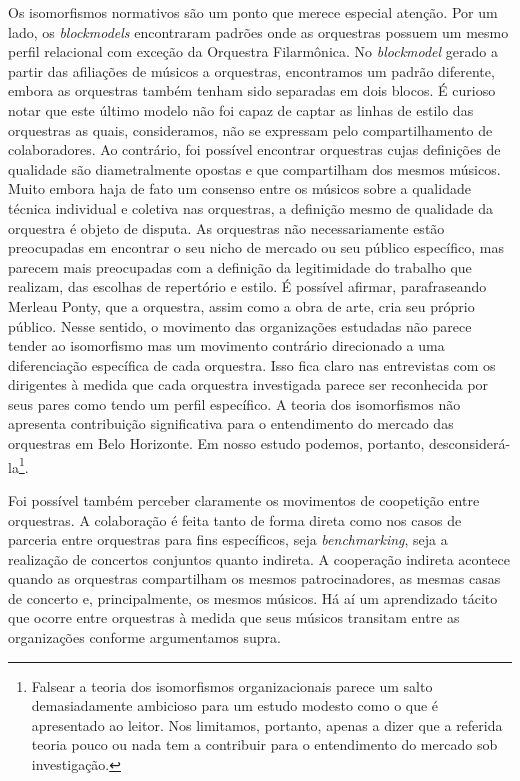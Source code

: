 \documentclass[a4paper, 12pt, openright, oneside, german, french, english, brazil]{abntex2}
\begin{document}
	Os isomorfismos normativos são um ponto que merece especial atenção. Por um lado, os \textit{blockmodels} encontraram padrões onde as orquestras possuem um mesmo perfil relacional com exceção da Orquestra Filarmônica. No \textit{blockmodel} gerado a partir das afiliações de músicos a orquestras, encontramos um padrão diferente, embora as orquestras também tenham sido separadas em dois blocos. É curioso notar que este último modelo não foi capaz de captar as linhas de estilo das orquestras as quais, consideramos, não se expressam pelo compartilhamento de colaboradores. Ao contrário, foi possível encontrar orquestras cujas definições de qualidade são diametralmente opostas e que compartilham dos mesmos músicos. Muito embora haja de fato um consenso entre os músicos sobre a qualidade técnica individual e coletiva nas orquestras, a definição mesmo de qualidade da orquestra é objeto de disputa. As orquestras não necessariamente estão preocupadas em encontrar o seu nicho de mercado ou seu público específico, mas parecem mais preocupadas com a definição da legitimidade do trabalho que realizam, das escolhas de repertório e estilo. É possível afirmar, parafraseando Merleau Ponty, que a orquestra, assim como a obra de arte, cria seu próprio público. Nesse sentido, o movimento das organizações estudadas não parece tender ao isomorfismo mas um movimento contrário direcionado a uma diferenciação específica de cada orquestra. Isso fica claro nas entrevistas com os dirigentes à medida que cada orquestra investigada parece ser reconhecida por seus pares como tendo um perfil específico. A teoria dos isomorfismos não apresenta contribuição significativa para o entendimento do mercado das orquestras em Belo Horizonte. Em nosso estudo podemos, portanto, desconsiderá-la\footnote{Falsear a teoria dos isomorfismos organizacionais parece um salto demasiadamente ambicioso para um estudo modesto como o que é apresentado ao leitor. Nos limitamos, portanto, apenas a dizer que a referida teoria pouco ou nada tem a contribuir para o entendimento do mercado sob investigação.}.
	
	Foi possível também perceber claramente os movimentos de coopetição entre orquestras. A colaboração é feita tanto de forma direta como nos casos de parceria entre orquestras para fins específicos, seja \textit{benchmarking}, seja a realização de concertos conjuntos quanto indireta. A cooperação indireta acontece quando as orquestras compartilham os mesmos patrocinadores, as mesmas casas de concerto e, principalmente, os mesmos músicos. Há aí um aprendizado tácito que ocorre entre orquestras à medida que seus músicos transitam entre as organizações conforme argumentamos supra.
\end{document}
